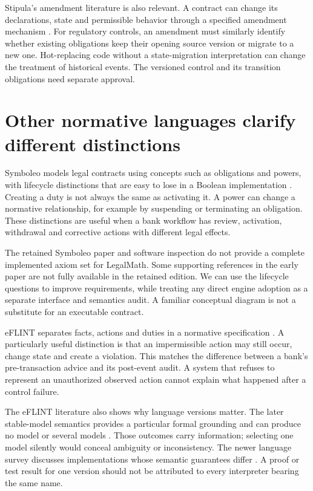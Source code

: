 \documentclass[12pt,a4paper,oneside,openany]{book}
\begin{document}
Stipula's amendment literature is also relevant. A contract can change its
declarations, state and permissible behavior through a specified amendment
mechanism \citep[secs.~3--5]{amending2023}. For regulatory controls, an amendment
must similarly identify whether existing obligations keep their opening source
version or migrate to a new one. Hot-replacing code without a state-migration
interpretation can change the treatment of historical events. The versioned
control and its transition obligations need separate approval.

\section{Other normative languages clarify different distinctions}
\label{sec:languages-other}
Symboleo models legal contracts using concepts such as obligations and powers,
with lifecycle distinctions that are easy to lose in a Boolean implementation
\citep[secs.~II--IV]{symboleo2020}. Creating a duty is not always the same as
activating it. A power can change a normative relationship, for example by
suspending or terminating an obligation. These distinctions are useful when a
bank workflow has review, activation, withdrawal and corrective actions with
different legal effects.

The retained Symboleo paper and software inspection do not provide a complete
implemented axiom set for LegalMath. Some supporting references in the early
paper are not fully available in the retained edition. We can use the lifecycle
questions to improve requirements, while treating any direct engine adoption
as a separate interface and semantics audit. A familiar conceptual diagram is
not a substitute for an executable contract.

eFLINT separates facts, actions and duties in a normative specification
\citep[secs.~3--5]{eflint2020}. A particularly useful distinction is that an
impermissible action may still occur, change state and create a violation.
This matches the difference between a bank's pre-transaction advice and its
post-event audit. A system that refuses to represent an unauthorized observed
action cannot explain what happened after a control failure.

The eFLINT literature also shows why language versions matter. The later
stable-model semantics provides a particular formal grounding and can produce
no model or several models \citep[translation and evaluation sections]{eflintstable2025}.
Those outcomes carry information; selecting one model silently would conceal
ambiguity or inconsistency. The newer language survey discusses implementations
whose semantic guarantees differ \citep{eflint2026}. A proof or test result for
one version should not be attributed to every interpreter bearing the same name.
\end{document}
